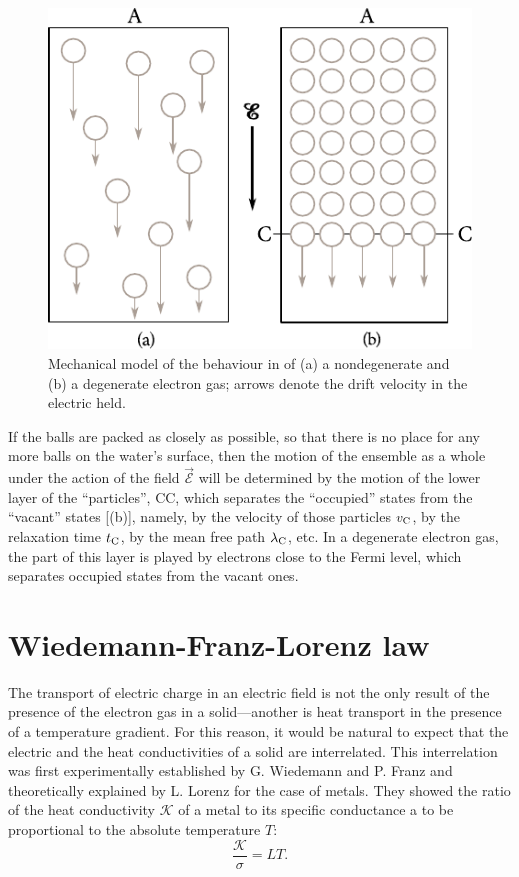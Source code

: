 \begin{figure}[t]
	\begin{center}
		\includegraphics[scale=1]{figures/ch_06/fig_6_4.pdf}
		\caption[]{Mechanical model of the behaviour in of (a) a nondegenerate and (b) a degenerate electron gas; arrows denote the drift velocity in the electric held.}
		\label{fig:6_4}
	\end{center}
	\vspace{-0.7cm}
\end{figure}

If the balls are packed as closely as possible, so that there is no place for any more balls on the water's surface, then the motion of the ensemble as a whole under the action of the field $\vec{\mathcal{E}}$ will be determined by the motion of the lower layer of the ``particles'', CC, which separates the ``occupied'' states from the ``vacant'' states [(b)], namely, by the velocity of those particles $v_{\text{C}}$, by the relaxation time $t_{\text{C}}$, by the mean free path $\lambda_{\text{C}}$, etc. In a degenerate electron gas, the part of this layer is played by electrons close to the Fermi level, which separates occupied states from the vacant ones.

\section{Wiedemann-Franz-Lorenz law}\label{sec:52}

The transport of electric charge in an electric field is not the only result of the presence of the electron gas in a solid---another is heat transport in the presence of a temperature gradient. For this reason, it would be natural to expect that the electric and the heat conductivities of a solid are interrelated. This interrelation was first experimentally established by G. Wiedemann and P. Franz and theoretically explained by L. Lorenz for the case of metals. They showed the ratio of the heat conductivity $\mathcal{K}$ of a metal to its specific conductance a to be proportional to the absolute temperature $T$:
\begin{equation}\label{eq:6_14}
    \frac{\mathcal{K}}{\sigma} = LT.
\end{equation}

